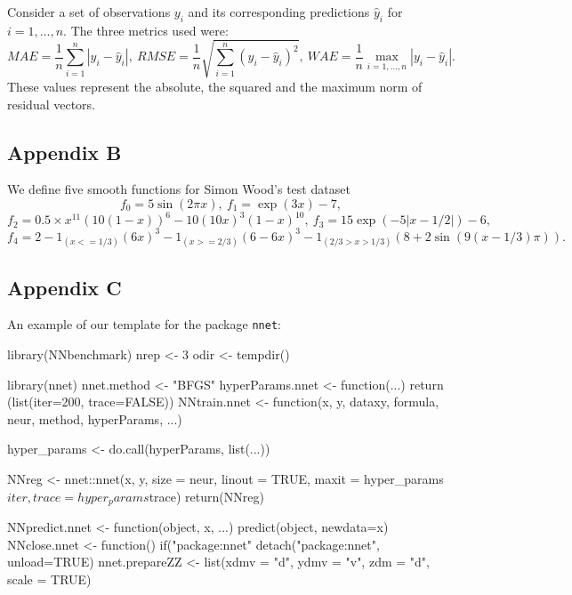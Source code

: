 Consider a set of observations \(y_i\) and its corresponding predictions
\(\hat y_i\) for \(i=1,\dots,n\). The three metrics used were: \[
MAE = \frac1n\sum_{i=1}^n|y_i - \hat y_i|,~
RMSE = \frac1n\sqrt{\sum_{i=1}^n(y_i - \hat y_i)^2},~
WAE = \frac1n\max_{i=1,\dots,n}|y_i - \hat y_i|.
\] These values represent the absolute, the squared and the maximum norm
of residual vectors.

\hypertarget{appendix-b}{%
\subsection{Appendix B}\label{appendix-b}}

We define five smooth functions for Simon Wood's test dataset \[
f_0=5\sin(2\pi x),~
f_1=\exp(3x)-7,
\] \[
f_2=0.5\times x^{11}(10(1 - x))^6 - 10 (10x)^3(1 - x)^{10},~
f_3=15 \exp(-5 |x-1/2|)-6,
\] \[
f_4=2-1_{(x <= 1/3)}(6x)^3 - 1_{(x >= 2/3)} (6-6x)^3 - 
1_{(2/3 > x > 1/3)}(8+2\sin(9(x-1/3)\pi)).
\]

\hypertarget{appendix-c}{%
\subsection{Appendix C}\label{appendix-c}}

An example of our template for the package \texttt{nnet}:

\begin{Schunk}
\begin{Sinput}
library(NNbenchmark)
nrep <- 3       
odir <- tempdir()

library(nnet)
nnet.method <- "BFGS"
hyperParams.nnet <- function(...) {
    return (list(iter=200, trace=FALSE))
}
NNtrain.nnet <- function(x, y, dataxy, formula, neur, method, hyperParams, ...) {
    
    hyper_params <- do.call(hyperParams, list(...))
    
    NNreg <- nnet::nnet(x, y, size = neur, linout = TRUE, 
                        maxit = hyper_params$iter, trace=hyper_params$trace)
    return(NNreg)
}
NNpredict.nnet  <- function(object, x, ...) { predict(object, newdata=x) }
NNclose.nnet    <- function() {  if("package:nnet" %in% search())
                                detach("package:nnet", unload=TRUE) }
nnet.prepareZZ  <- list(xdmv = "d", ydmv = "v", zdm = "d", scale = TRUE)
\end{Sinput}
\end{Schunk}

